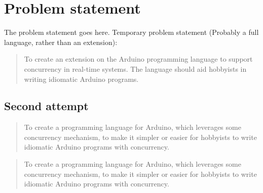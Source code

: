 \section{Problem statement}\label{sec:problemstatement}
The problem statement goes here. Temporary problem statement (Probably a full language, rather than an extension):

\blockquote{To create an extension on the Arduino programming language to support concurrency in real-time systems. The language should aid hobbyists in writing idiomatic Arduino programs.}

\subsection{Second attempt}

\blockquote{To create a programming language for Arduino, which leverages some concurrency mechanism, to make it simpler or easier for hobbyists to write idiomatic Arduino programs with concurrency.}


\blockquote{To create a programming language for Arduino, which leverages some concurrency mechanism, to make it simpler or easier for hobbyists to write idiomatic Arduino programs with concurrency.}